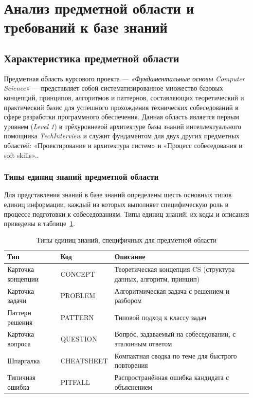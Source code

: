 \section{Анализ предметной области и требований к базе знаний}
\label{sec:analysis}

\subsection{Характеристика предметной области}
\label{subsec:domain-characteristics}

Предметная область курсового проекта — \textit{«Фундаментальные основы Computer Science»} — представляет собой систематизированное множество базовых концепций, принципов, алгоритмов и паттернов, составляющих теоретический и практический базис для успешного прохождения технических собеседований в сфере разработки программного обеспечения. Данная область является первым уровнем (\textit{Level 1}) в трёхуровневой архитектуре базы знаний интеллектуального помощника \textit{TechInterview} и служит фундаментом для двух других предметных областей: «Проектирование и архитектура систем» и «Процесс собеседования и soft skills»..

\subsubsection*{Типы единиц знаний предметной области}

Для представления знаний в базе знаний определены шесть основных типов единиц информации, каждый из которых выполняет специфическую роль в процессе подготовки к собеседованиям. Типы единиц знаний, их коды и описания приведены в таблице~\ref{tab:knowledge-units}.

\begin{table}[h]
\centering
\caption{Типы единиц знаний, специфичных для предметной области}
\label{tab:knowledge-units}
\begin{tabular}{|l|l|p{6cm}|}
\hline
\textbf{Тип} & \textbf{Код} & \textbf{Описание} \\ \hline
Карточка концепции & CONCEPT & Теоретическая концепция CS (структура данных, алгоритм, принцип) \\ \hline
Карточка задачи & PROBLEM & Алгоритмическая задача с решением и разбором \\ \hline
Паттерн решения & PATTERN & Типовой подход к классу задач \\ \hline
Карточка вопроса & QUESTION & Вопрос, задаваемый на собеседовании, с эталонным ответом \\ \hline
Шпаргалка & CHEATSHEET & Компактная сводка по теме для быстрого повторения \\ \hline
Типичная ошибка & PITFALL & Распространённая ошибка кандидата с объяснением \\ \hline
\end{tabular}
\end{table}

